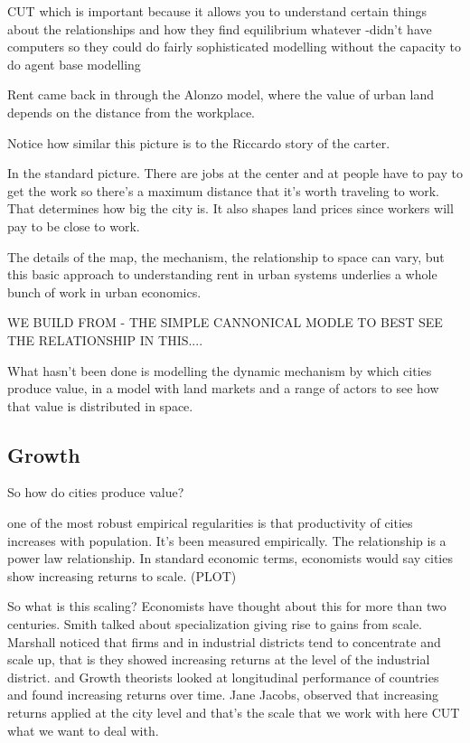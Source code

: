 \documentclass[]{article}
\begin{document}
CUT which is important because it allows you to understand certain things about the relationships and how they find equilibrium whatever
-didn’t have computers so they could do fairly sophisticated modelling without the capacity to do agent base modelling 

Rent came back in through the Alonzo model, where the value of urban land depends on the distance from the workplace. 

Notice how similar this picture is to the Riccardo story of the carter.

In  the standard picture. There are jobs at the center and at people have to pay to get the work so  there's a maximum distance that it's worth traveling to work. That determines how big the city is. It also shapes land prices since workers will pay to be close to work.

The details of the map, the mechanism, the relationship to space can vary, but this basic approach to understanding rent in urban systems underlies a whole bunch of work in urban economics.

WE BUILD FROM - THE SIMPLE CANNONICAL MODLE TO BEST SEE THE RELATIONSHIP IN THIS....

What hasn't been done is modelling the dynamic mechanism by which cities produce value, in a model with land markets and a range of actors to see how that value is distributed in space. 



\subsection{Growth}
So how do cities produce value?



one of the most robust empirical regularities is that 
productivity of cities increases with population. It's been measured empirically. The relationship is a power law relationship. In  standard economic terms, economists would say cities show increasing returns to scale. (PLOT)

So what is this  scaling?
Economists have thought about this for more than two centuries. Smith talked about specialization giving rise to gains from scale. 
Marshall noticed that firms and in industrial districts tend to concentrate and scale up, that is they showed increasing returns at the level of the industrial district. 
and Growth theorists looked at longitudinal performance of countries and found increasing returns over time.
Jane Jacobs, observed that increasing returns applied at the city level and that's the scale that we work with here CUT what we want to deal with.
\end{document}
